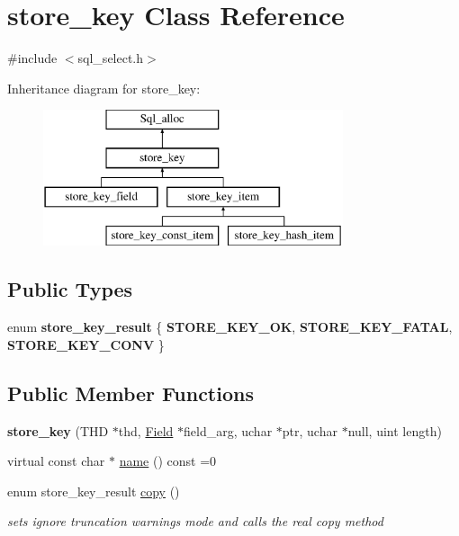 \hypertarget{classstore__key}{}\section{store\+\_\+key Class Reference}
\label{classstore__key}


{\ttfamily \#include $<$sql\+\_\+select.\+h$>$}

Inheritance diagram for store\+\_\+key\+:\begin{figure}[H]
\begin{center}
\leavevmode
\includegraphics[height=4.000000cm]{classstore__key}
\end{center}
\end{figure}
\subsection*{Public Types}
\begin{DoxyCompactItemize}
\item 
\mbox{\label{classstore__key_aaf0d1c720a5e918b4148b9aa5faa8ab5}} 
enum {\bfseries store\+\_\+key\+\_\+result} \{ {\bfseries S\+T\+O\+R\+E\+\_\+\+K\+E\+Y\+\_\+\+OK}, 
{\bfseries S\+T\+O\+R\+E\+\_\+\+K\+E\+Y\+\_\+\+F\+A\+T\+AL}, 
{\bfseries S\+T\+O\+R\+E\+\_\+\+K\+E\+Y\+\_\+\+C\+O\+NV}
 \}
\end{DoxyCompactItemize}
\subsection*{Public Member Functions}
\begin{DoxyCompactItemize}
\item 
\mbox{\label{classstore__key_a5a4ca6ff9b86660b16b133baf9483799}} 
{\bfseries store\+\_\+key} (T\+HD $\ast$thd, \mbox{\hyperlink{classField}{Field}} $\ast$field\+\_\+arg, uchar $\ast$ptr, uchar $\ast$null, uint length)
\item 
virtual const char $\ast$ \mbox{\hyperlink{classstore__key_a1c78dad4f3335d03b297cf30592914bf}{name}} () const =0
\item 
enum store\+\_\+key\+\_\+result \mbox{\hyperlink{classstore__key_a55d3bd31a4655a157fee7b42a15adfb4}{copy}} ()
\begin{DoxyCompactList}\small\item\em sets ignore truncation warnings mode and calls the real copy method \end{DoxyCompactList}\end{DoxyCompactItemize}
